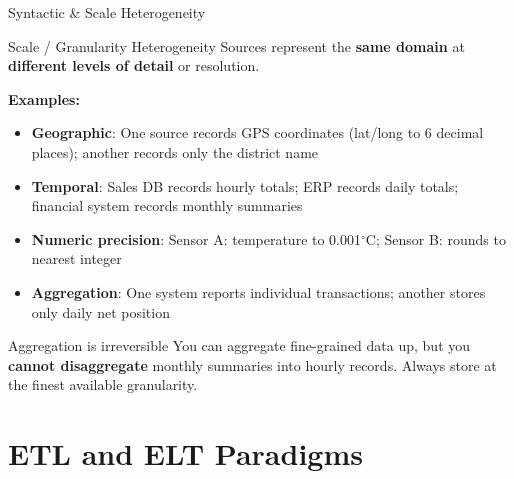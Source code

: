 \documentclass[aspectratio=169,10pt]{beamer}
\begin{document}
\begin{frame}{Syntactic \& Scale Heterogeneity}
   
      \begin{block}{Scale / Granularity Heterogeneity}
        Sources represent the \textbf{same domain} at \textbf{different levels of detail} or resolution.
      \end{block}
      \vspace{4pt}
      \textbf{Examples:}
      \begin{itemize}
        \item \textbf{Geographic}: One source records GPS coordinates (lat/long to 6 decimal places); another records only the district name
        \item \textbf{Temporal}: Sales DB records hourly totals; ERP records daily totals; financial system records monthly summaries
        \item \textbf{Numeric precision}: Sensor A: temperature to 0.001$^\circ$C; Sensor B: rounds to nearest integer
        \item \textbf{Aggregation}: One system reports individual transactions; another stores only daily net position
      \end{itemize}
      \vspace{4pt}
      \begin{alertblock}{Aggregation is irreversible}
        You can aggregate fine-grained data up, but you \textbf{cannot disaggregate} monthly summaries into hourly records.  Always store at the finest available granularity.
      \end{alertblock}
 
\end{frame}
\section{ETL and ELT Paradigms}
\end{document}
